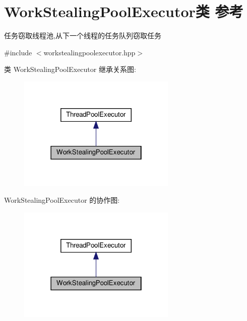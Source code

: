 \hypertarget{classWorkStealingPoolExecutor}{}\section{Work\+Stealing\+Pool\+Executor类 参考}
\label{classWorkStealingPoolExecutor}


任务窃取线程池,从下一个线程的任务队列窃取任务  




{\ttfamily \#include $<$workstealingpoolexecutor.\+hpp$>$}



类 Work\+Stealing\+Pool\+Executor 继承关系图\+:
\nopagebreak
\begin{figure}[H]
\begin{center}
\leavevmode
\includegraphics[width=214pt]{classWorkStealingPoolExecutor__inherit__graph}
\end{center}
\end{figure}


Work\+Stealing\+Pool\+Executor 的协作图\+:
\nopagebreak
\begin{figure}[H]
\begin{center}
\leavevmode
\includegraphics[width=214pt]{classWorkStealingPoolExecutor__coll__graph}
\end{center}
\end{figure}
